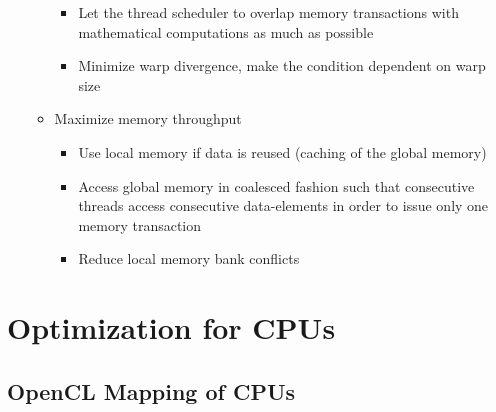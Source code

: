 \documentclass[paper=a4, fontsize=11pt]{scrartcl} %
\numberwithin{equation}{section} %
\numberwithin{figure}{section} %
\numberwithin{table}{section} %
\begin{document}
\begin{itemize}
\begin{itemize}
\begin{itemize}
      \item Let the thread scheduler to overlap memory transactions with mathematical computations as much as possible
      \item Minimize warp divergence, make the condition dependent on warp size
    \end{itemize}
    \item Maximize memory throughput
    \begin{itemize}
      \item Use local memory if data is reused (caching of the global memory)
      \item Access global memory in coalesced fashion such that consecutive threads access consecutive data-elements in order to issue only one memory transaction
      \item Reduce local memory bank conflicts
    \end{itemize}
  \end{itemize}
\end{itemize}

\section{Optimization for CPUs}

\subsection{OpenCL Mapping of CPUs}
\end{document}
